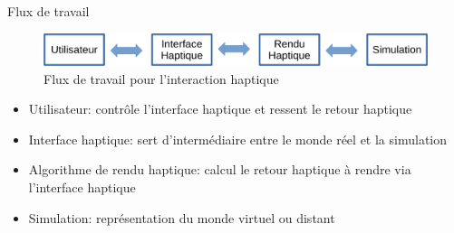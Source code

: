 \begin{frame}{Flux de travail}

\begin{figure}
\centering
\includegraphics[width=\linewidth]{images/schema_haptique}	
\caption{Flux de travail pour l'interaction haptique}
\end{figure}

\begin{itemize}
\item Utilisateur: contrôle l'interface haptique et ressent le retour haptique
\item Interface haptique: sert d'intermédiaire entre le monde réel et la simulation
\item Algorithme de rendu haptique: calcul le retour haptique à rendre via l'interface haptique
\item Simulation: représentation du monde virtuel ou distant
\end{itemize}	
\end{frame}